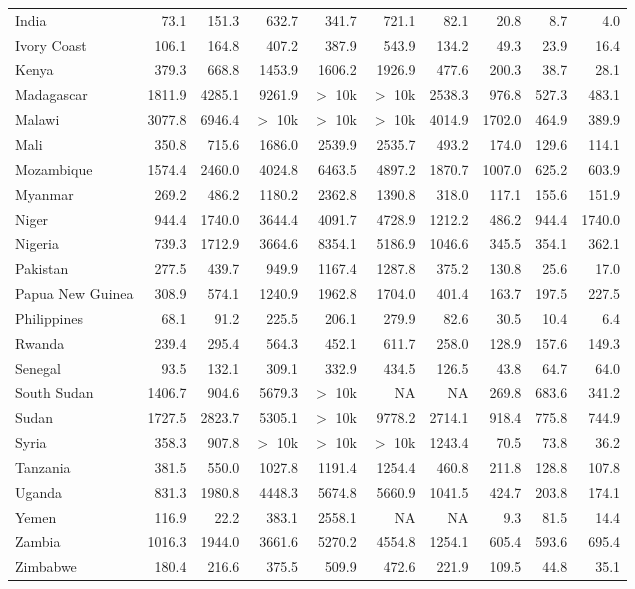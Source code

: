 \begin{table}[h]
{\begin{tabular}[t]{lrrrrrrrrr}
India & 73.1 & 151.3 & 632.7 & 341.7 & 721.1 & 82.1 & 20.8 & 8.7 & 4.0\\
Ivory Coast & 106.1 & 164.8 & 407.2 & 387.9 & 543.9 & 134.2 & 49.3 & 23.9 & 16.4\\
Kenya & 379.3 & 668.8 & 1453.9 & 1606.2 & 1926.9 & 477.6 & 200.3 & 38.7 & 28.1\\
Madagascar & 1811.9 & 4285.1 & 9261.9 & $>$ 10k & $>$ 10k & 2538.3 & 976.8 & 527.3 & 483.1\\
Malawi & 3077.8 & 6946.4 & $>$ 10k & $>$ 10k & $>$ 10k & 4014.9 & 1702.0 & 464.9 & 389.9\\
Mali & 350.8 & 715.6 & 1686.0 & 2539.9 & 2535.7 & 493.2 & 174.0 & 129.6 & 114.1\\
Mozambique & 1574.4 & 2460.0 & 4024.8 & 6463.5 & 4897.2 & 1870.7 & 1007.0 & 625.2 & 603.9\\
Myanmar & 269.2 & 486.2 & 1180.2 & 2362.8 & 1390.8 & 318.0 & 117.1 & 155.6 & 151.9\\
Niger & 944.4 & 1740.0 & 3644.4 & 4091.7 & 4728.9 & 1212.2 & 486.2 & 944.4 & 1740.0\\
Nigeria & 739.3 & 1712.9 & 3664.6 & 8354.1 & 5186.9 & 1046.6 & 345.5 & 354.1 & 362.1\\
Pakistan & 277.5 & 439.7 & 949.9 & 1167.4 & 1287.8 & 375.2 & 130.8 & 25.6 & 17.0\\
Papua New Guinea & 308.9 & 574.1 & 1240.9 & 1962.8 & 1704.0 & 401.4 & 163.7 & 197.5 & 227.5\\
Philippines & 68.1 & 91.2 & 225.5 & 206.1 & 279.9 & 82.6 & 30.5 & 10.4 & 6.4\\
Rwanda & 239.4 & 295.4 & 564.3 & 452.1 & 611.7 & 258.0 & 128.9 & 157.6 & 149.3\\
Senegal & 93.5 & 132.1 & 309.1 & 332.9 & 434.5 & 126.5 & 43.8 & 64.7 & 64.0\\
South Sudan & 1406.7 & 904.6 & 5679.3 & $>$ 10k & NA & NA & 269.8 & 683.6 & 341.2\\
Sudan & 1727.5 & 2823.7 & 5305.1 & $>$ 10k & 9778.2 & 2714.1 & 918.4 & 775.8 & 744.9\\
Syria & 358.3 & 907.8 & $>$ 10k & $>$ 10k & $>$ 10k & 1243.4 & 70.5 & 73.8 & 36.2\\
Tanzania & 381.5 & 550.0 & 1027.8 & 1191.4 & 1254.4 & 460.8 & 211.8 & 128.8 & 107.8\\
Uganda & 831.3 & 1980.8 & 4448.3 & 5674.8 & 5660.9 & 1041.5 & 424.7 & 203.8 & 174.1\\
Yemen & 116.9 & 22.2 & 383.1 & 2558.1 & NA & NA & 9.3 & 81.5 & 14.4\\
Zambia & 1016.3 & 1944.0 & 3661.6 & 5270.2 & 4554.8 & 1254.1 & 605.4 & 593.6 & 695.4\\
Zimbabwe & 180.4 & 216.6 & 375.5 & 509.9 & 472.6 & 221.9 & 109.5 & 44.8 & 35.1\\
\bottomrule
\end{tabular}}
\end{table}